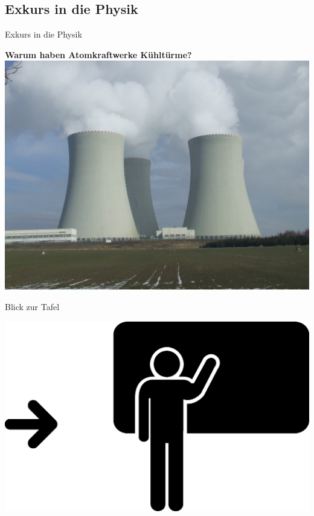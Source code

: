 \subsection{Exkurs in die Physik}


\begin{frame}{Exkurs in die Physik}

\textbf{Warum haben Atomkraftwerke Kühltürme?}\\[2em]
\centering
\includegraphics[height=0.8\textheight]{src/akw.jpg}

\end{frame}



\begin{frame}{Blick zur Tafel}

\centering

\includegraphics[width=\linewidth]{src/blackboard}

\end{frame}



